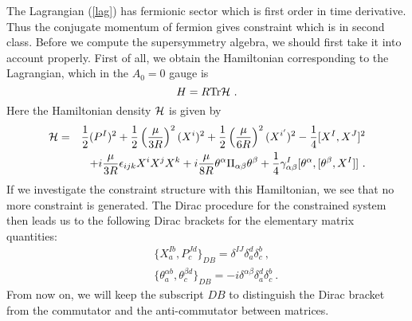 \documentclass[a4paper,12pt]{article}
\begin{document}
The Lagrangian (\ref{lag}) has fermionic sector which is first order
in time derivative.  Thus the conjugate momentum of fermion gives
constraint which is in second class.  Before we compute the
supersymmetry algebra, we should first take it into account properly.
First of all, we obtain the Hamiltonian corresponding to the
Lagrangian, which in the $A_0=0$ gauge is
\begin{equation}
H = R {\rm Tr} {\cal H}~.
\end{equation}
Here the Hamiltonian density ${\cal H}$ is given by
\begin{eqnarray}
{\cal H}
 &=& \frac{1}{2} (P^I)^2
   +\frac{1}{2} \left( \frac{\mu}{3R} \right)^2 (X^i)^2
   +\frac{1}{2} \left( \frac{\mu}{6R} \right)^2 (X^{i'})^2
 - \frac{1}{4} [ X^I, X^J ]^2
                                        \nonumber \\
 & & + i \frac{\mu}{3R} \epsilon_{ijk} X^i X^j X^k
     + i\frac{\mu}{8R} \theta^\alpha \Pi_{\alpha\beta}
                       \theta^\beta
     + \frac{1}{4} \gamma^I_{\alpha\beta} [ \theta^\alpha, [
     \theta^\beta, X^I ]]~.
\end{eqnarray}
If we investigate the constraint structure with this Hamiltonian, we
see that no more constraint is generated. The Dirac procedure for the
constrained system then leads us to the following Dirac brackets for
the elementary matrix quantities:
\begin{eqnarray}
& & \{ X^{I b}_a, P^{J d}_c \}_{DB}
    = \delta^{IJ} \delta^d_a \delta^b_c~,
                    \nonumber \\
& & \{ \theta^{\alpha b}_a, \theta^{\beta d}_c \}_{DB}
    = -i \delta^{\alpha \beta} \delta^d_a \delta^b_c~.
    \label{db}
\end{eqnarray}
From now on, we will keep the subscript $DB$ to distinguish the Dirac
bracket from the commutator and the anti-commutator between matrices.
\end{document}
